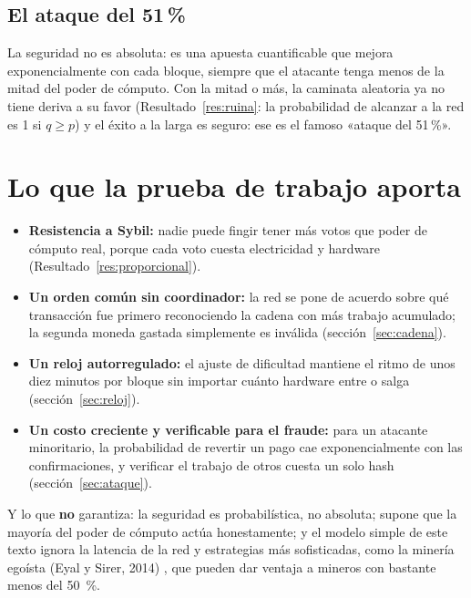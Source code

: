 \documentclass[11pt,a4paper]{article}
\newcommand{\webhint}[1]{}
\begin{document}
\subsection{El ataque del \texorpdfstring{51\,\%}{51 \%}}

La seguridad no es absoluta: es una apuesta cuantificable que mejora exponencialmente con cada bloque, siempre que el atacante tenga menos de la mitad del poder de cómputo. Con la mitad o más, la caminata aleatoria ya no tiene deriva a su favor (Resultado~\ref{res:ruina}: la probabilidad de alcanzar a la red es 1 si $q\ge p$) y el éxito a la larga es seguro: ese es el famoso «ataque del 51\,\%».

\section{Lo que la prueba de trabajo aporta}\label{sec:aporta}
\webhint{section; id=sec-aporta; slug=que-se-resolvio; kicker=11 — qué se resolvió, en concreto; role=summary}

\begin{itemize}[leftmargin=1.4em,itemsep=3pt]
  \item \textbf{Resistencia a Sybil:} nadie puede fingir tener más votos que poder de cómputo real, porque cada voto cuesta electricidad y hardware (Resultado~\ref{res:proporcional}).
  \item \textbf{Un orden común sin coordinador:} la red se pone de acuerdo sobre qué transacción fue primero reconociendo la cadena con más trabajo acumulado; la segunda moneda gastada simplemente es inválida (sección~\ref{sec:cadena}).
  \item \textbf{Un reloj autorregulado:} el ajuste de dificultad mantiene el ritmo de unos diez minutos por bloque sin importar cuánto hardware entre o salga (sección~\ref{sec:reloj}).
  \item \textbf{Un costo creciente y verificable para el fraude:} para un atacante minoritario, la probabilidad de revertir un pago cae exponencialmente con las confirmaciones, y verificar el trabajo de otros cuesta un solo hash (sección~\ref{sec:ataque}).
\end{itemize}

Y lo que \textbf{no} garantiza: la seguridad es probabilística, no absoluta; supone que la mayoría del poder de cómputo actúa honestamente; y el modelo simple de este texto ignora la latencia de la red y estrategias más sofisticadas, como la minería egoísta (Eyal y Sirer, 2014) \cite{eyal2014}, que pueden dar ventaja a mineros con bastante menos del \SI{50}{\percent}.
\end{document}
